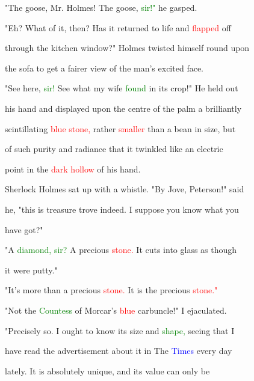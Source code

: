  "The goose, Mr. Holmes! The goose, \textcolor{green}{sir!"} he gasped.



 "Eh? What of it, then? Has it returned to life and \textcolor{red}{flapped} off

 through the kitchen window?" Holmes twisted himself round upon

 the sofa to get a fairer view of the man's \textcolor{BurntOrange}{excited} face.



 "See here, \textcolor{green}{sir!} See what my wife \textcolor{green}{found} in its crop!" He held out

 his hand and displayed upon the centre of the palm a brilliantly

 scintillating \textcolor{red}{blue} \textcolor{red}{stone,} rather \textcolor{red}{smaller} than a bean in size, but

 of such \textcolor{BurntOrange}{purity} and \textcolor{BurntOrange}{radiance} that it \textcolor{BurntOrange}{twinkled} like an \textcolor{BurntOrange}{electric}

 point in the \textcolor{red}{dark} \textcolor{red}{hollow} of his hand.



 Sherlock Holmes sat up with a whistle. "By Jove, Peterson!" said

 he, "this is \textcolor{BurntOrange}{treasure} trove indeed. I suppose you know what you

 have got?"



 "A \textcolor{green}{diamond,} \textcolor{green}{sir?} A \textcolor{BurntOrange}{precious} \textcolor{red}{stone.} It cuts into glass as though

 it were putty."



 "It's more than a \textcolor{BurntOrange}{precious} \textcolor{red}{stone.} It is the \textcolor{BurntOrange}{precious} \textcolor{red}{stone."}



 "Not the \textcolor{green}{Countess} of Morcar's \textcolor{red}{blue} carbuncle!" I ejaculated.



 "Precisely so. I ought to know its size and \textcolor{green}{shape,} seeing that I

 have read the advertisement about it in The \textcolor{blue}{Times} every day

 lately. It is absolutely \textcolor{BurntOrange}{unique,} and its value can only be

